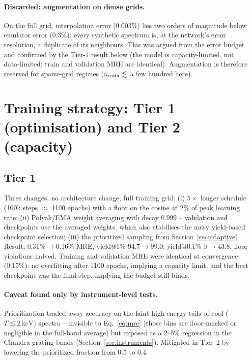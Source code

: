 \documentclass[11pt,a4paper]{article}
\newcommand{\kev}{\,\mathrm{keV}}
\begin{document}
\paragraph{Discarded: augmentation on dense grids.} On the full grid,
interpolation error ($0.003\%$) lies two orders of magnitude below
emulator error ($0.3\%$): every synthetic spectrum is, at the network's
error resolution, a duplicate of its neighbours. This was argued from
the error budget and confirmed by the Tier-1 result below (the model is
capacity-limited, not data-limited: train and validation MRE are
identical). Augmentation is therefore reserved for sparse-grid regimes
($n_{\rm train}\lesssim$ a few hundred here).

\section{Training strategy: Tier 1 (optimisation) and Tier 2 (capacity)}
\label{sec:tier2}

\subsection{Tier 1}
Three changes, no architecture change, full training grid:
(i) $5\times$ longer schedule (100k steps $\approx$ 1100 epochs) with a
floor on the cosine at $2\%$ of peak learning rate; (ii) Polyak/EMA
weight averaging \citep{polyak92,izmailov18} with decay $0.999$ --
validation and checkpoints use the averaged weights, which also
stabilises the noisy yield-based checkpoint selection; (iii) the
prioritized sampling from Section~\ref{sec:adaptive}. Result:
$0.31\%\to\mathbf{0.16\%}$ MRE, yield@1\% $94.7\to99.0$, yield@0.1\%
$0\to43.8$, floor violations halved. Training and validation MRE were
identical at convergence (0.15\%): no overfitting after 1100 epochs,
implying a capacity limit, and the best checkpoint was the final step,
implying the budget still binds.

\paragraph{Caveat found only by instrument-level tests.} Prioritization
traded away accuracy on the faint high-energy tails of cool ($T\lesssim
2\kev$) spectra -- invisible to Eq.~\ref{eq:mre} (those bins are
floor-masked or negligible in the full-band average) but exposed as a
2--5\% regression in the Chandra grating bands
(Section~\ref{sec:instruments}). Mitigated in Tier~2 by lowering the
prioritized fraction from $0.5$ to $0.4$.
\end{document}
